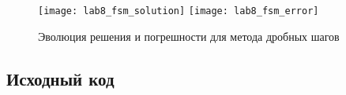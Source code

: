 \pagebreak

\begin{figure}[h!]
\centering
\texttt{[image: lab8\_fsm\_solution]}\hfill
\texttt{[image: lab8\_fsm\_error]}
\caption{Эволюция решения и погрешности для метода дробных шагов}
\end{figure}

\subsection{Исходный код}

\pagebreak
